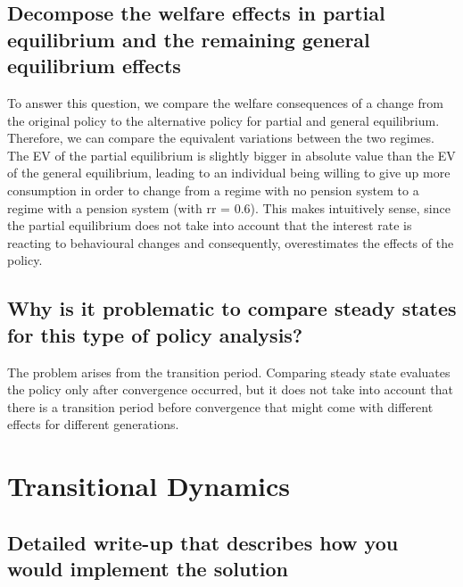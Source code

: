 \documentclass[12pt,a4paper]{article}
\begin{document}
\subsection{Decompose the welfare effects in partial equilibrium and the remaining general equilibrium effects}
To answer this question, we compare the welfare consequences of a change from the original policy to the alternative policy for partial and general equilibrium. Therefore, we can compare the equivalent variations between the two regimes. The EV of the partial equilibrium is slightly bigger in absolute value than the EV of the general equilibrium, leading to an individual being willing to give up more consumption in order to change from a regime with no pension system to a regime with a pension system (with rr = 0.6). This makes intuitively sense, since the partial equilibrium does not take into account that the interest rate is reacting to behavioural changes and consequently, overestimates the effects of the policy. 

\subsection{Why is it problematic to compare steady states for this type of policy analysis?}
The problem arises from the transition period. Comparing steady state evaluates the policy only after convergence occurred, but it does not take into account that there is a transition period before convergence that might come with different effects for different generations. 

\section{Transitional Dynamics}

\subsection{Detailed write-up that describes how you would implement the solution}
\end{document}
